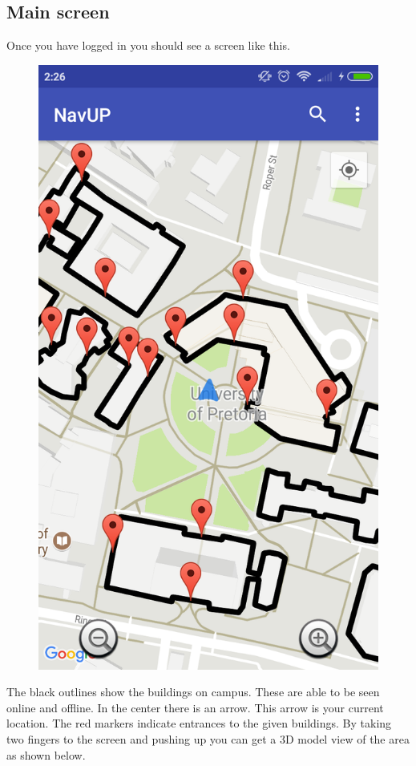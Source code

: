 \documentclass{article}
\begin{document}
\subsection{Main screen}
Once you have logged in you should see a screen like this.

\begin{figure}[h!]
\centering
\includegraphics[scale=0.15]{topmap.png}
\end{figure}

The black outlines show the buildings on campus. These are able to be seen online and offline. In the center there is an arrow. This arrow is your current location. The red markers indicate entrances to the given buildings.
By taking two fingers to the screen and pushing up you can get a 3D model view of the area as shown below.
\end{document}
